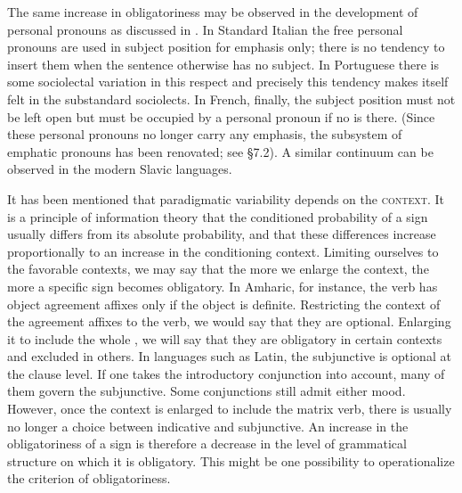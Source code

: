 The same increase in obligatoriness may be observed in the development of personal pronouns as discussed in . In Standard Italian the free personal pronouns are used in subject position for emphasis only; there is no tendency to insert them when the sentence otherwise has no subject. In Portuguese there is some sociolectal variation in this respect and precisely this tendency makes itself felt in the substandard sociolects. In French, finally, the subject position must not be left open but must be occupied by a personal pronoun if no \np is there. (Since these personal pronouns no longer carry any emphasis, the subsystem of emphatic pronouns has been renovated; see §7.2). A similar continuum can be observed in the modern Slavic languages.

It has been mentioned that paradigmatic variability depends on the \textsc{context}. It is a principle of information theory that the conditioned probability of a sign usually differs from its absolute probability, and that these differences increase proportionally to an increase in the conditioning context. Limiting ourselves to the favorable contexts, we may say that the more we enlarge the context, the more a specific sign becomes obligatory. In Amharic, for instance, the verb has object agreement affixes only if the object is definite. Restricting the context of the agreement affixes to the verb, we would say that they are optional. Enlarging it to include the whole \vp, we will say that they are obligatory in certain contexts and excluded in others. In languages such as Latin, the subjunctive is optional at the clause level. If one takes the introductory conjunction into account, many of them govern the subjunctive. Some conjunctions still admit either mood. However, once the context is enlarged to include the matrix verb, there is usually no longer a choice between indicative and subjunctive. An increase in the obligatoriness of a sign is therefore a decrease in the level of grammatical structure on which it is obligatory. This might be one possibility to operationalize the criterion of obligatoriness.


